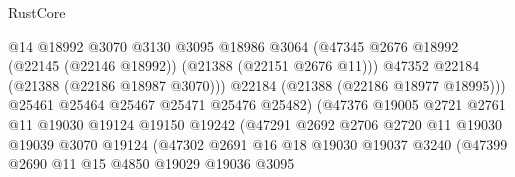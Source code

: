 \begin{lexlean}{RustCore}
\begin{coremodule}
                                        @14
                                        @18992
                                        @3070
                                        @3130
                                        @3095
                                        @18986
                                        @3064
                                        (@47345
                                          @2676
                                          @18992
                                          (@22145 (@22146 @18992))
                                          (@21388 (@22151 @2676 @11)))
                                        @47352
                                        @22184
                                        (@21388 (@22186 @18987 @3070)))
                                      @22184
                                      (@21388 (@22186 @18977 @18995)))
                                    @25461
                                    @25464
                                    @25467
                                    @25471
                                    @25476
                                    @25482)
                                  (@47376
                                    @19005
                                    @2721
                                    @2761
                                    @11
                                    @19030
                                    @19124
                                    @19150
                                    @19242
                                    (@47291
                                      @2692
                                      @2706
                                      @2720
                                      @11
                                      @19030
                                      @19039
                                      @3070
                                      @19124
                                      (@47302
                                        @2691
                                        @16
                                        @18
                                        @19030
                                        @19037
                                        @3240
                                        (@47399
                                          @2690
                                          @11
                                          @15
                                          @4850
                                          @19029
                                          @19036
                                          @3095

\end{coremodule}
\end{lexlean}
